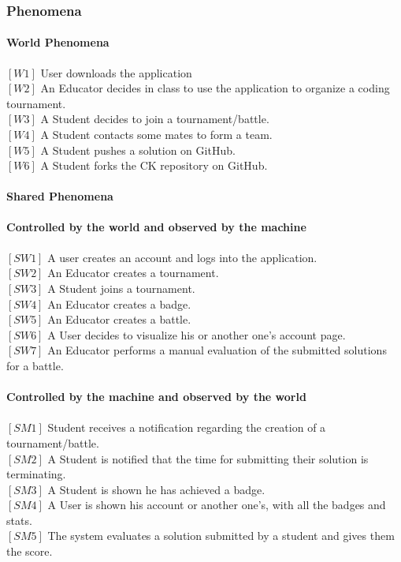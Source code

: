 \documentclass{article}
\begin{document}
      \subsubsection{Phenomena}
            \paragraph{World Phenomena}
            $[W1]$ User downloads the application\\
            $[W2]$ An Educator decides in class to use the application to organize a coding tournament.\\
            $[W3]$ A Student decides to join a tournament/battle.\\
            $[W4]$ A Student contacts some mates to form a team.\\
            $[W5]$ A Student pushes a solution on GitHub.\\
            $[W6]$ A Student forks the CK repository on GitHub.

            \paragraph{Shared Phenomena}
            \textbf{Controlled by the world and observed by the machine} \\\\
            $[SW1]$ A user creates an account and logs into the application.\\
            $[SW2]$ An Educator creates a tournament.\\
            $[SW3]$ A Student joins a tournament.\\
            $[SW4]$ An Educator creates a badge.\\
            $[SW5]$ An Educator creates a battle.\\
            $[SW6]$ A User decides to visualize his or another one's account page.\\
            $[SW7]$ An Educator performs a manual evaluation of the submitted solutions for a battle.
\\\\
            \textbf{Controlled by the machine and observed by the world}\\\\
            $[SM1]$ Student receives a notification regarding the creation of a tournament/battle. \\
            $[SM2]$ A Student is notified that the time for submitting their solution is terminating.\\
            $[SM3]$ A Student is shown he has achieved a badge.\\
            $[SM4]$ A User is shown his account or another one's, with all the badges and stats.\\
            $[SM5]$ The system evaluates a solution submitted by a student and gives them the score.
\end{document}
